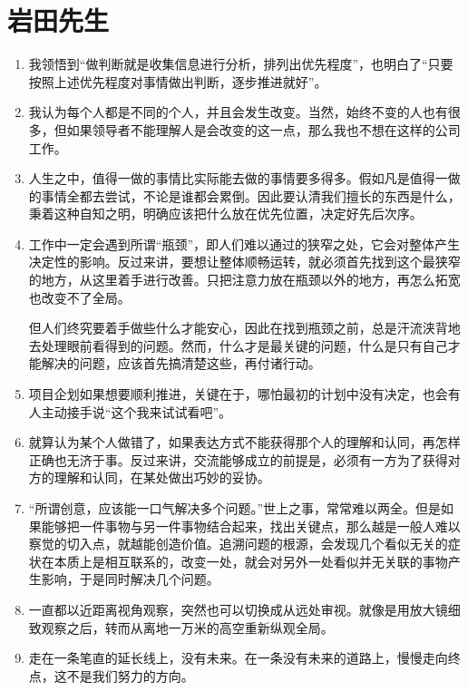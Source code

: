 \documentclass[UTF8]{ctexart}
\begin{document}
	\newpage
	
	\section{岩田先生}
		\begin{enumerate}
			\item  我领悟到“做判断就是收集信息进行分析，排列出优先程度”，也明白了“只要按照上述优先程度对事情做出判断，逐步推进就好”。
			\item 我认为每个人都是不同的个人，并且会发生改变。当然，始终不变的人也有很多，但如果领导者不能理解人是会改变的这一点，那么我也不想在这样的公司工作。
			\item 人生之中，值得一做的事情比实际能去做的事情要多得多。假如凡是值得一做的事情全都去尝试，不论是谁都会累倒。因此要认清我们擅长的东西是什么，秉着这种自知之明，明确应该把什么放在优先位置，决定好先后次序。
			
			\item 工作中一定会遇到所谓“瓶颈”，即人们难以通过的狭窄之处，它会对整体产生决定性的影响。反过来讲，要想让整体顺畅运转，就必须首先找到这个最狭窄的地方，从这里着手进行改善。只把注意力放在瓶颈以外的地方，再怎么拓宽也改变不了全局。
			
			但人们终究要着手做些什么才能安心，因此在找到瓶颈之前，总是汗流浃背地去处理眼前看得到的问题。然而，什么才是最关键的问题，什么是只有自己才能解决的问题，应该首先搞清楚这些，再付诸行动。
			
			\item 项目企划如果想要顺利推进，关键在于，哪怕最初的计划中没有决定，也会有人主动接手说“这个我来试试看吧”。
			
			\item 就算认为某个人做错了，如果表达方式不能获得那个人的理解和认同，再怎样正确也无济于事。反过来讲，交流能够成立的前提是，必须有一方为了获得对方的理解和认同，在某处做出巧妙的妥协。
			
			\item “所谓创意，应该能一口气解决多个问题。”世上之事，常常难以两全。但是如果能够把一件事物与另一件事物结合起来，找出关键点，那么越是一般人难以察觉的切入点，就越能创造价值。追溯问题的根源，会发现几个看似无关的症状在本质上是相互联系的，改变一处，就会对另外一处看似并无关联的事物产生影响，于是同时解决几个问题。
			
			\item 一直都以近距离视角观察，突然也可以切换成从远处审视。就像是用放大镜细致观察之后，转而从离地一万米的高空重新纵观全局。
			
			\item 走在一条笔直的延长线上，没有未来。在一条没有未来的道路上，慢慢走向终点，这不是我们努力的方向。
		\end{enumerate}
	
\end{document}
